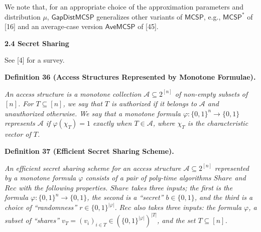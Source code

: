 \documentclass[10pt,a4paper]{article}
\begin{document}



We note that, for an appropriate choice of the approximation parameters and distribution $\mu$, ${\mathsf{GapDistMCSP}}$ generalizes other variants of ${\mathsf{MCSP}}$, e.g., ${\mathsf{MCSP}}^{*}$ of [16] and an average-case version ${\mathsf{Ave}}{\mathsf{MCSP}}$ of [45].\par





\par\medskip\noindent\textbf{
2.4 Secret Sharing}\par




See [4] for a survey.\par





\par\medskip\noindent\textbf{
\textbf{Definition 36}\textbf{ }(Access Structures Represented by Monotone Formulae)\textbf{.}
}\par



\emph{An access structure is a monotone collection $\mathcal{A}\subseteq 2^{[n]}$ of non-empty subsets of $[n]$. For $T\subseteq[n]$, we say that $T$ is authorized if it belongs to $\mathcal{A}$ and unauthorized otherwise. We say that a monotone formula $\varphi:\{0,1\}^{n}\to\{0,1\}$ represents $\mathcal{A}$ if $\varphi(\chi_{T})=1$ exactly when $T\in\mathcal{A}$, where $\chi_{T}$ is the characteristic vector of $T$.}\par







\par\medskip\noindent\textbf{
\textbf{Definition 37}\textbf{ }(Efficient Secret Sharing Scheme)\textbf{.}
}\par



\emph{An efficient secret sharing scheme for an access structure $\mathcal{A}\subseteq 2^{[n]}$ represented by a monotone formula $\varphi$ consists of a pair of poly-time algorithms $Share$ and $Rec$ with the following properties. $Share$ takes three inputs; the first is the formula $\varphi:\{0,1\}^{n}\to\{0,1\}$, the second is a “secret” $b\in\{0,1\}$, and the third is a choice of “randomness” $r\in\{0,1\}^{|\varphi|}$. $Rec$ also takes three inputs: the formula $\varphi$, a subset of “shares” $v_{T}=(v_{i})_{i\in T}\in\left(\{0,1\}^{|\varphi|}\right)^{|T|}$, and the set $T\subseteq[n]$.}\par
\end{document}
